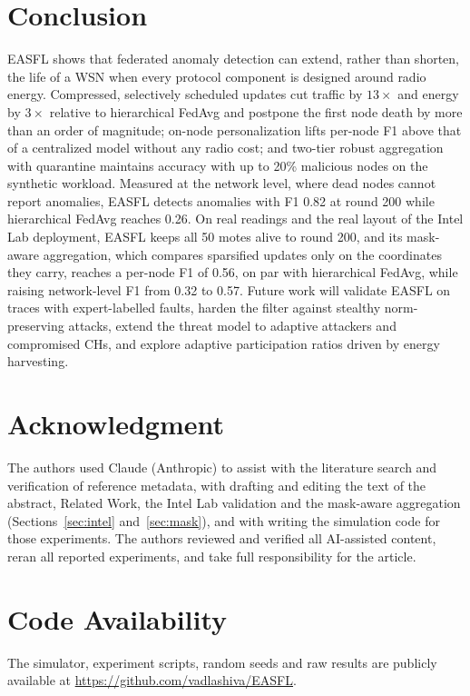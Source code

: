 \documentclass[journal]{IEEEtran}
\begin{document}
\section{Conclusion}
EASFL shows that federated anomaly detection can extend, rather than shorten, the life of a WSN when every protocol component is designed around radio energy. Compressed, selectively scheduled updates cut traffic by $13\times$ and energy by $3\times$ relative to hierarchical FedAvg and postpone the first node death by more than an order of magnitude; on-node personalization lifts per-node F1 above that of a centralized model without any radio cost; and two-tier robust aggregation with quarantine maintains accuracy with up to 20\% malicious nodes on the synthetic workload. Measured at the network level, where dead nodes cannot report anomalies, EASFL detects anomalies with F1 0.82 at round 200 while hierarchical FedAvg reaches 0.26. On real readings and the real layout of the Intel Lab deployment, EASFL keeps all 50 motes alive to round 200, and its mask-aware aggregation, which compares sparsified updates only on the coordinates they carry, reaches a per-node F1 of 0.56, on par with hierarchical FedAvg, while raising network-level F1 from 0.32 to 0.57. Future work will validate EASFL on traces with expert-labelled faults, harden the filter against stealthy norm-preserving attacks, extend the threat model to adaptive attackers and compromised CHs, and explore adaptive participation ratios driven by energy harvesting.

\section*{Acknowledgment}
The authors used Claude (Anthropic) to assist with the literature search and verification of reference metadata, with drafting and editing the text of the abstract, Related Work, the Intel Lab validation and the mask-aware aggregation (Sections~\ref{sec:intel} and~\ref{sec:mask}), and with writing the simulation code for those experiments. The authors reviewed and verified all AI-assisted content, reran all reported experiments, and take full responsibility for the article.

\section*{Code Availability}
The simulator, experiment scripts, random seeds and raw results are publicly available at \url{https://github.com/vadlashiva/EASFL}.



\end{document}
